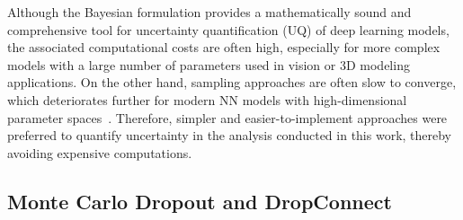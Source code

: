 Although the Bayesian formulation provides a mathematically sound and comprehensive tool for uncertainty quantification (UQ) of deep learning models, the associated computational costs are often high, especially for more complex models with a large number of parameters used in vision or 3D modeling applications. On the other hand, sampling approaches are often slow to converge, which deteriorates further for modern NN models with high-dimensional parameter spaces~\cite{BayesNN}. Therefore, simpler and easier-to-implement approaches were preferred to quantify uncertainty in the analysis conducted in this work, thereby avoiding expensive computations.



    \subsection{Monte Carlo Dropout and DropConnect}\label{MCDrop}
